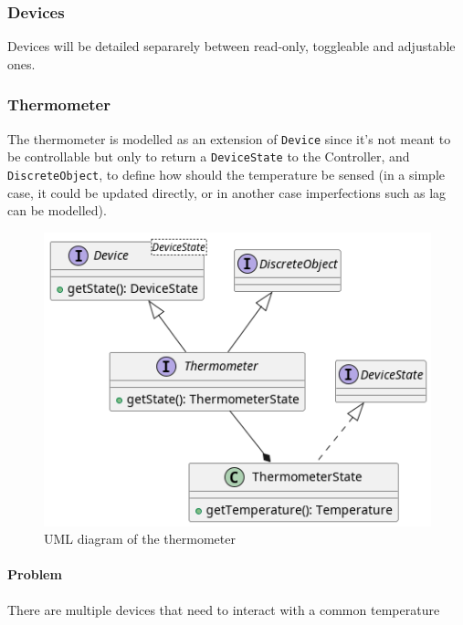 \subsubsection{Devices}

Devices will be detailed separarely between read-only, toggleable and adjustable ones.

\subsubsection{Thermometer}

The thermometer is modelled as an extension of \texttt{Device} since it's not meant to be controllable
but only to return a \texttt{DeviceState} to the Controller,
and \texttt{DiscreteObject}, to define how should the temperature be sensed (in
a simple case, it could be updated directly, or in another case imperfections such as lag can be modelled).


\begin{figure}[H]
\centering{}
\includegraphics[width=\textwidth,height=\textheight,keepaspectratio]{magnani/uml/thermometer.png}
\caption{UML diagram of the thermometer}
\label{magnani:uml:thermometer}
\end{figure}

\paragraph{Problem} There are multiple devices that need to interact with a common temperature
